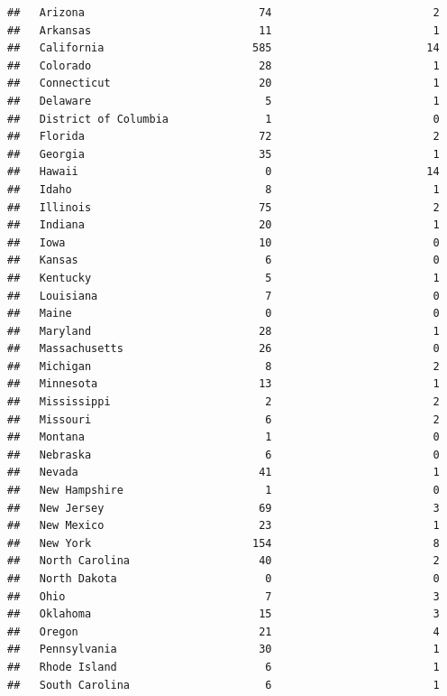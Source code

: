 \documentclass[]{book}
\newenvironment{Shaded}{\begin{snugshade}}{\end{snugshade}}
\theoremstyle{definition}
\theoremstyle{definition}
\theoremstyle{definition}
\theoremstyle{remark}
\begin{document}
\begin{Shaded}
\begin{Highlighting}[]
\begin{Shaded}
\begin{Highlighting}[]
\begin{verbatim}
##   Arizona                           74                         2
##   Arkansas                          11                         1
##   California                       585                        14
##   Colorado                          28                         1
##   Connecticut                       20                         1
##   Delaware                           5                         1
##   District of Columbia               1                         0
##   Florida                           72                         2
##   Georgia                           35                         1
##   Hawaii                             0                        14
##   Idaho                              8                         1
##   Illinois                          75                         2
##   Indiana                           20                         1
##   Iowa                              10                         0
##   Kansas                             6                         0
##   Kentucky                           5                         1
##   Louisiana                          7                         0
##   Maine                              0                         0
##   Maryland                          28                         1
##   Massachusetts                     26                         0
##   Michigan                           8                         2
##   Minnesota                         13                         1
##   Mississippi                        2                         2
##   Missouri                           6                         2
##   Montana                            1                         0
##   Nebraska                           6                         0
##   Nevada                            41                         1
##   New Hampshire                      1                         0
##   New Jersey                        69                         3
##   New Mexico                        23                         1
##   New York                         154                         8
##   North Carolina                    40                         2
##   North Dakota                       0                         0
##   Ohio                               7                         3
##   Oklahoma                          15                         3
##   Oregon                            21                         4
##   Pennsylvania                      30                         1
##   Rhode Island                       6                         1
##   South Carolina                     6                         1

\end{verbatim}
\end{Highlighting}
\end{Shaded}
\end{Highlighting}
\end{Shaded}
\end{document}
